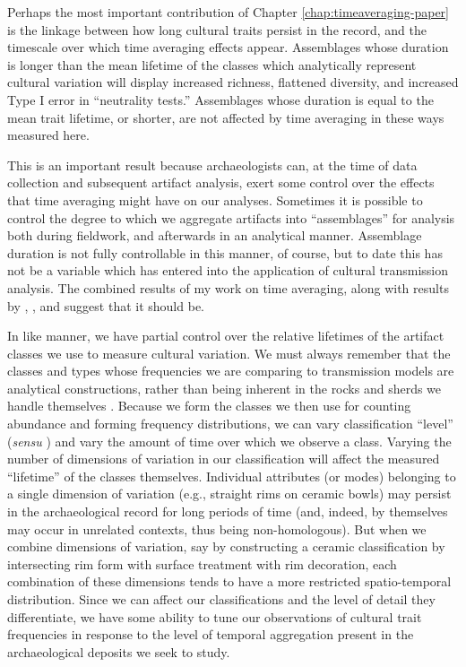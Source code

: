 Perhaps the most important contribution of Chapter \ref{chap:timeaveraging-paper} is the linkage between how long cultural traits persist in the record, and the timescale over which time averaging effects appear.  Assemblages whose duration is longer than the mean lifetime of the classes which analytically represent cultural variation will display increased richness, flattened diversity, and increased Type I error in ``neutrality tests.''  Assemblages whose duration is equal to the mean trait lifetime, or shorter, are not affected by time averaging in these ways measured here.  

This is an important result because archaeologists can, at the time of data collection and subsequent artifact analysis, exert some control over the effects that time averaging might have on our analyses.  Sometimes it is possible to control the degree to which we aggregate artifacts into ``assemblages'' for analysis both during fieldwork, and afterwards in an analytical manner.  Assemblage duration is not fully controllable in this manner, of course, but to date this has not be a variable which has entered into the application of cultural transmission analysis.  The combined results of my work on time averaging, along with results by \citet{Premo2014}, \citet{Porvcic2014}, and \citep{perreault2018time,perreault2019quality} suggest that it should be.

In like manner, we have partial control over the relative lifetimes of the artifact classes we use to measure cultural variation.  We must always remember that the classes and types whose frequencies we are comparing to transmission models are analytical constructions, rather than being inherent in the rocks and sherds we handle themselves \citep{Dunnell1971}.  Because we form the classes we then use for counting abundance and forming frequency distributions, we can vary classification ``level'' (\emph{sensu} \citealt{Dunnell1971}) and vary the amount of time over which we observe a class.  Varying the number of dimensions of variation in our classification will affect the measured ``lifetime'' of the classes themselves.  Individual attributes (or modes) belonging to a single dimension of variation (e.g., straight rims on ceramic bowls) may persist in the archaeological record for long periods of time (and, indeed, by themselves may occur in unrelated contexts, thus being non-homologous).  But when we combine dimensions of variation, say by constructing a ceramic classification by intersecting rim form with surface treatment with rim decoration, each combination of these dimensions tends to have a more restricted spatio-temporal distribution.  Since we can affect our classifications and the level of detail they differentiate, we have some ability to tune our observations of cultural trait frequencies in response to the level of temporal aggregation present in the archaeological deposits we seek to study.  

